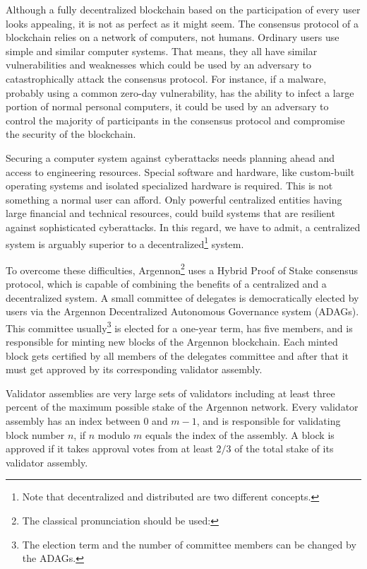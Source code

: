 Although a fully decentralized blockchain based on the participation of every user looks appealing, it is not as perfect
as it might seem. The consensus protocol of a blockchain relies on a network of computers, not humans. Ordinary users
use simple and similar computer systems. That means, they all have similar vulnerabilities and weaknesses which could be
used by an adversary to catastrophically attack the consensus protocol. For instance, if a malware, probably using a
common zero-day
vulnerability, has the ability to infect a large portion of normal personal computers, it could be used by an
adversary to control the majority of participants in the consensus protocol and compromise the security of the
blockchain.

Securing a computer system against cyberattacks needs planning ahead and access to engineering resources.
Special software and hardware, like custom-built operating systems and isolated specialized hardware is required.
This is not something a normal user can afford. Only powerful centralized entities having large financial and
technical resources, could build
systems that are resilient against sophisticated cyberattacks. In this regard, we have to admit, a centralized system is
arguably superior to a decentralized\footnote{Note that decentralized and distributed are two different concepts.}
system.

To overcome these difficulties, Argennon\footnote{The classical pronunciation should be used:}
uses a Hybrid Proof of Stake consensus protocol, which is
capable of combining the benefits of a centralized and a decentralized system. A small committee of
delegates is democratically elected by users via the Argennon Decentralized Autonomous Governance system
(ADAGs). This committee usually\footnote{The election term and the number of committee members can be changed by the
ADAGs.} is elected for a one-year term, has five members, and is responsible for minting new
blocks of the Argennon blockchain.
Each minted block gets certified by all members of the delegates committee and after that it must get approved
by its corresponding validator assembly.

Validator assemblies are very
large sets of validators including at least three percent of the maximum possible stake of the Argennon network.
Every validator assembly has an index between $0$ and $m - 1$, and is responsible for validating block number $n$,
if $n$ modulo $m$ equals the index of the assembly. A block is approved if it takes approval votes from at
least $2/3$ of the total stake of its validator assembly.

